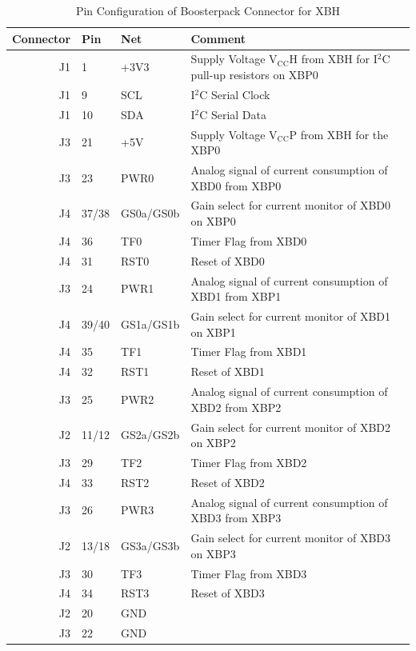 \documentclass[twoside,11pt]{cergdoc}
\begin{document}
\begin{table}[ht]
  \begin{center}
    \caption{Pin Configuration of Boosterpack Connector for XBH}
    \begin{tabular}{rlll}
      Connector & Pin  & Net         & Comment  \\ \hline
       J1 & 1  & +3V3      & Supply Voltage $\mathrm{V_{CC}H}$ from XBH for I$^2$C pull-up resistors on XBP0 \\
       J1 & 9  & SCL       & I$^2$C Serial Clock  \\
       J1 & 10 & SDA       & I$^2$C Serial Data \\ 
       J3 & 21 & +5V       & Supply Voltage $\mathrm{V_{CC}P}$ from XBH for the XBP0 \\ \hline

       J3 & 23 & PWR0      & Analog signal of current consumption of XBD0 from XBP0\\
       J4 & 37/38 & GS0a/GS0b & Gain select for current monitor of XBD0 on XBP0\\
       J4 & 36 & TF0       & Timer Flag from XBD0 \\
       J4 & 31 & RST0      & Reset of XBD0 \\ \hline

       J3 & 24 & PWR1      & Analog signal of current consumption of XBD1 from XBP1 \\
       J4 & 39/40 & GS1a/GS1b & Gain select for current monitor of XBD1 on XBP1\\
       J4 & 35 & TF1       & Timer Flag from XBD1 \\
       J4 & 32 & RST1      & Reset of XBD1 \\ \hline

       J3 & 25 & PWR2      & Analog signal of current consumption of XBD2 from XBP2 \\
       J2 & 11/12 & GS2a/GS2b & Gain select for current monitor of XBD2 on XBP2\\
       J3 & 29 & TF2       & Timer Flag from XBD2 \\
       J4 & 33 & RST2      & Reset of XBD2 \\ \hline

       J3 & 26 & PWR3      & Analog signal of current consumption of XBD3 from XBP3 \\
       J2 & 13/18 & GS3a/GS3b & Gain select for current monitor of XBD3 on XBP3\\
       J3 & 30 & TF3       & Timer Flag from XBD3 \\
       J4 & 34 & RST3      & Reset of XBD3 \\ \hline

       J2 & 20 & GND       & \\
       J3 & 22 & GND       & \\ \hline
    \end{tabular}
  \end{center}
\end{table}
\end{document}
